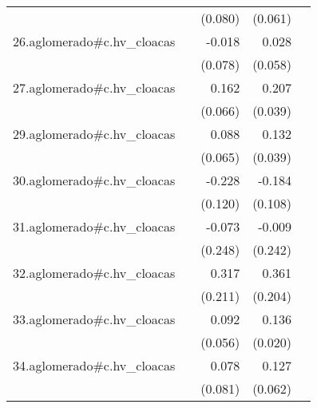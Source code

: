 {\begin{longtable}{l*{4}{D{.}{.}{-1}}}
            &                     &     (0.080)         &     (0.061)         &                     \\
\addlinespace
26.aglomerado#c.hv\_cloacas&                     &      -0.018         &       0.028         &                     \\
            &                     &     (0.078)         &     (0.058)         &                     \\
\addlinespace
27.aglomerado#c.hv\_cloacas&                     &       0.162\sym{*}  &       0.207\sym{***}&                     \\
            &                     &     (0.066)         &     (0.039)         &                     \\
\addlinespace
29.aglomerado#c.hv\_cloacas&                     &       0.088         &       0.132\sym{***}&                     \\
            &                     &     (0.065)         &     (0.039)         &                     \\
\addlinespace
30.aglomerado#c.hv\_cloacas&                     &      -0.228         &      -0.184         &                     \\
            &                     &     (0.120)         &     (0.108)         &                     \\
\addlinespace
31.aglomerado#c.hv\_cloacas&                     &      -0.073         &      -0.009         &                     \\
            &                     &     (0.248)         &     (0.242)         &                     \\
\addlinespace
32.aglomerado#c.hv\_cloacas&                     &       0.317         &       0.361         &                     \\
            &                     &     (0.211)         &     (0.204)         &                     \\
\addlinespace
33.aglomerado#c.hv\_cloacas&                     &       0.092         &       0.136\sym{***}&                     \\
            &                     &     (0.056)         &     (0.020)         &                     \\
\addlinespace
34.aglomerado#c.hv\_cloacas&                     &       0.078         &       0.127\sym{*}  &                     \\
            &                     &     (0.081)         &     (0.062)         &                     \\

\end{longtable}}
